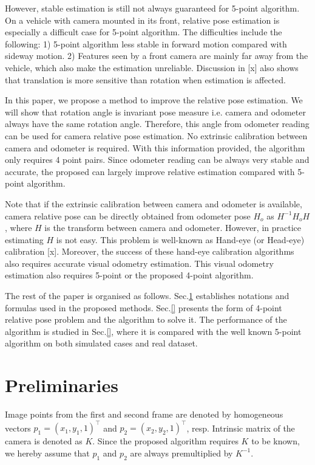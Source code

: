 \documentclass{article}
\begin{document}
However, stable estimation is still not always guaranteed for 5-point algorithm. On a vehicle with camera mounted in its front, relative pose estimation is especially a difficult case for 5-point algorithm. The difficulties include the following: 1) 5-point algorithm less stable in forward motion compared with sideway motion. 2) Features seen by a front camera are mainly far away from the vehicle, which also make the estimation unreliable. Discussion in [x] also shows that translation is more sensitive than rotation when estimation is affected. 

In this paper, we propose a method to improve the relative pose estimation. We will show that rotation angle is invariant pose measure i.e. camera and odometer always have the same rotation angle. Therefore, this angle from odometer reading can be used for camera relative pose estimation. No extrinsic calibration between camera and odometer is required. With this information provided, the algorithm only requires 4 point pairs. Since odometer reading can be always very stable and accurate, the proposed can largely improve relative estimation compared with 5-point algorithm. 

Note that if the extrinsic calibration between camera and odometer is available, camera relative pose can be directly obtained from odometer pose $H_o$ as $H^{-1} H_o H$, where $H$ is the transform between camera and odometer. However, in practice estimating $H$ is not easy. This problem is well-known as Hand-eye (or Head-eye) calibration [x]. Moreover, the success of these hand-eye calibration algorithms also requires accurate visual odometry estimation. This visual odometry estimation also requires 5-point or the proposed 4-point algorithm. 

The rest of the paper is organised as follows. Sec.\ref{Preliminaries} establishes notations and formulas used in the proposed methods. Sec.\ref{} presents the form of 4-point relative pose problem and the algorithm to solve it. The performance of the algorithm is studied in Sec.\ref{}, where it is compared with the well known 5-point algorithm on both simulated cases and real dataset. 

\section{Preliminaries}
\label{Preliminaries}

Image points from the first and second frame are denoted by homogeneous vectors $p_1 = (x_1, y_1, 1)^\top$ and $p_2 = (x_2, y_2, 1)^\top$, resp. Intrinsic matrix of the camera is denoted as $K$. Since the proposed algorithm requires $K$ to be known, we hereby assume that $p_1$ and $p_2$ are always premultiplied by $K^{-1}$. 
\end{document}
